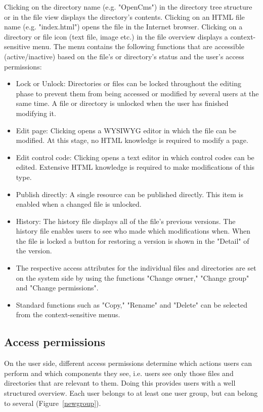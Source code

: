 Clicking on the directory name (e.g. "OpenCms") in the directory
tree structure or in the file view displays the directory's
contents. Clicking on an HTML file name (e.g. "index.html") opens
the file in the Internet browser. Clicking on a directory or file
icon (text file, image etc.) in the file overview displays a
context-sensitive menu. The menu contains the following functions
that are accessible (active/inactive) based on the file's or
directory's status and the user's access permissions:

\begin{itemize}
\item Lock or Unlock: Directories or files can be locked throughout
the editing phase to prevent them from being accessed or modified
by several users at the same time. A file or directory is unlocked
when the user has finished modifying it.
\item Edit page: Clicking opens a WYSIWYG editor in which the file can be modified.
At this stage, no HTML knowledge is required to modify a page.
\item Edit control code: Clicking opens a text editor in which
control codes can be edited. Extensive HTML knowledge is required
to make modifications of this type.
\item Publish directly: A single resource can be published
directly. This item is enabled when a changed file is unlocked.
\item History: The history file displays all of the file's previous
versions. The history file enables users to see who made which
modifications when. When the file is locked a button for restoring
a version is shown in the "Detail" of the version.
\item The respective access
attributes for the individual files and directories are set on the
system side by using the functions "Change owner," "Change group"
and "Change permissions".
\item Standard functions such as "Copy,"
"Rename" and "Delete" can be selected from the context-sensitive
menus.
\end{itemize}

\subsection{Access permissions}

On the user side, different access permissions determine which
actions users can perform and which components they see, i.e.
users see only those files and directories that are relevant to
them. Doing this provides users with a well structured overview.
Each user belongs to at least one user group, but can belong to
several (Figure~\ref{newgroup}).

